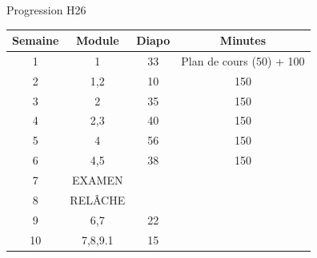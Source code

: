 \documentclass[12pt,french]{article}
\begin{document}
\Large{Progression H26}


\begin{table}[h]
    \centering
    \begin{tabular}{|c|c|c|c|}
    \hline
       Semaine  & Module & Diapo & Minutes \\
       \hline
        1   & 1 & 33 & Plan de cours (50) + 100\\
        \hline
        2 & 1,2 & 10 & 150 \\
        \hline
        3 & 2 & 35 & 150 \\
        \hline
        4 & 2,3 & 40 & 150 \\
        \hline
        5 & 4 & 56 & 150\\
        \hline
        6 & 4,5  & 38 & 150 \\
        \hline
        7 & EXAMEN  &  &  \\
        \hline
        8 & RELÂCHE  &  &  \\
        \hline
        9 & 6,7  & 22 &  \\
        \hline
        10 & 7,8,9.1  & 15 &  \\
        \hline
    \end{tabular}

\end{table}
\end{document}
